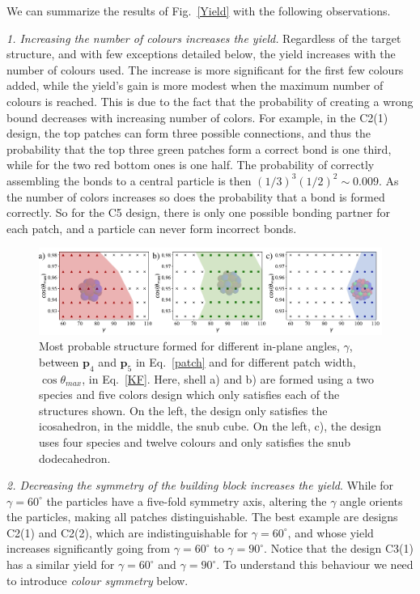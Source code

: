 \documentclass[a4paper, amsfonts, amssymb, amsmath, reprint, showkeys, nofootinbib, oneside]{revtex4-1}
\begin{document}
We can summarize the results of Fig.~\ref{Yield} with the following observations.


\noindent
\emph{1. Increasing the number of colours increases the yield.} Regardless of the target structure, and with few exceptions detailed below, the yield increases with the number of colours used. The increase is more significant for the first few colours added, while the yield's gain is more modest when the maximum number of colours is reached.
This is due to the fact that the probability of creating a wrong bound decreases with increasing number of colors. For example, in the C2(1) design, the top patches can form three possible connections, and thus the probability that the top three green patches form a correct bond is one third, while for the two red bottom ones is one half. The probability of correctly assembling the bonds to a central particle is then $(1/3)^3 (1/2)^2\sim 0.009$. As the number of colors increases so does the probability that a bond is formed correctly. So for the C5 design, there is only one possible bonding partner for each patch, and a particle can never form incorrect bonds.

\begin{figure}[t]
	\includegraphics{fig6.pdf}
	\caption{\label{Sol} Most probable structure formed for different in-plane angles, $\gamma$, between $\textbf{p}_4$ and $\textbf{p}_5$ in Eq.~\ref{patch} and for different patch width, $\cos\theta_{max}$, in Eq.~\ref{KF}. Here, shell a) and b) are formed using a two species and five colors design which only satisfies each of the structures shown. On the left, the design only satisfies the icosahedron, in the middle, the snub cube. On the left, c), the design uses four species and twelve colours and only satisfies the snub dodecahedron.}
\end{figure}

\noindent
\emph{2. Decreasing the symmetry of the building block increases the yield}. While for $\gamma=60^\circ$ the particles have a five-fold symmetry axis, altering the $\gamma$ angle orients the particles, making all patches distinguishable. The best example are designs C2(1) and C2(2), which are indistinguishable for $\gamma=60^\circ$, and whose yield increases significantly going from $\gamma=60^\circ$ to $\gamma=90^\circ$. Notice that the design C3(1) has a similar yield for $\gamma=60^\circ$ and $\gamma=90^\circ$. To understand this behaviour we need to introduce \emph{colour symmetry} below.
\end{document}
